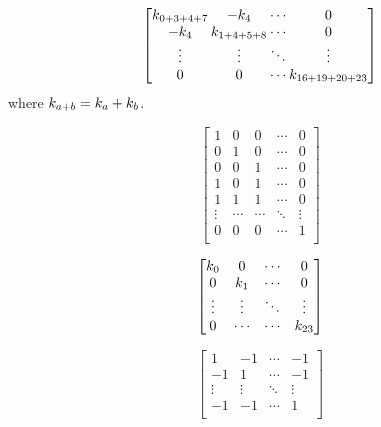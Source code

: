 \begin{equation}\label{eq:implementation:rhs}
{
	\arraycolsep=1pt
	\begin{bmatrix}
		\spring{0 + 3 + 4 + 7}	& -\spring{4}			& \cdots & 0\\
		- \spring{4} 			& \spring{1 + 4+ 5 + 8}	& \cdots & 0\\
		\vdots					& \vdots 				& \ddots & \vdots\\
		0						& 0 					& \cdots & \spring{16 + 19 + 20 + 23}\\
	\end{bmatrix}
}
\end{equation}
where $k_{a + b} = k_{a} + k_{b}$. 

\begin{equation}\label{eq:implementation:adjacency}
	\begin{bmatrix}
		1 		& 0 		& 0 		& \cdots 	& 0\\
		0 		& 1 		& 0 		& \cdots 	& 0\\
		0 		& 0 		& 1 		& \cdots 	& 0\\
		1 		& 0 		& 1 		& \cdots 	& 0\\
		1 		& 1 		& 1 		& \cdots 	& 0\\
		\vdots	& \cdots 	& \cdots 	& \ddots 	& \vdots\\
		0 		& 0 		& 0 		& \cdots 	& 1\\
	\end{bmatrix}
\end{equation}

\begin{equation}\label{eq:implementation:springConstantMatrix}
	\begin{bmatrix}
		k_{0} 	& 0 			& \cdots & 0\\
		0 			& k_{1}	& \cdots & 0\\	
		\vdots 		& \vdots		& \ddots & \vdots\\
		0 			& \cdots		& \cdots & k_{23}\\
	\end{bmatrix}
\end{equation}

\begin{equation}\label{eq:implementation:correctionMatrix}
	\begin{bmatrix}
		1 			& -1 			& \cdots & -1\\
		-1 			& 1				& \cdots & -1\\	
		\vdots 		& \vdots		& \ddots & \vdots\\
		-1 			& -1			& \cdots & 1\\		
	\end{bmatrix}
\end{equation}


